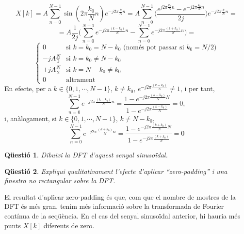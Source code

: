 \documentclass[11pt,a4]{article}
\numberwithin{equation}{section}
\theoremstyle{thmstyle}
\theoremstyle{thmstyle}
\theoremstyle{thmstyle}
\theoremstyle{thmstyle}
\theoremstyle{thmstyle}
\theoremstyle{thmstyle}
\newtheorem{question}{Qüestió}
\theoremstyle{thmstyle}
\renewcommand{\ss}{\scriptstyle}
\begin{document}
$$X[k] = A\sum_{n=0}^{N-1}\sin(2\pi\frac{k_0}{N}n)e^{-j2\pi\frac{k}{N}n} = A\sum_{n=0}^{N-1}\Big(\frac{e^{j2\pi\frac{k_0}{N}n}-e^{-j2\pi\frac{k_0}{N}n}}{2j}\Big)e^{-j2\pi\frac{k}{N}n}=
$$
$$
=A\frac{1}{2j}\Big(\sum_{n=0}^{N-1}e^{-j2\pi\frac{(k-k_0)}{N}n}-\sum_{n=0}^{N-1}e^{-j2\pi\frac{(k+k_0)}{N}n}\Big)=
$$
$$
\begin{cases}
0                 & \text{si $k=k_0=N-k_0$ (només pot passar si $k_0 = N/2$)} \\
-jA\frac{N}{2}     & \text{si $k=k_0\neq N-k_0$} \\
+jA\frac{N}{2}     & \text{si $k=N-k_0\neq k_0$} \\
0                 & \text{altrament}
\end{cases}
$$
En efecte, per a $k\in\lbrace 0,1,\cdots,N-1\rbrace$, $k\neq k_0$, $e^{-j2\pi\frac{(k-k_0)}{N}}\neq 1$, i per tant,
$$
\sum_{n=0}^{N-1}e^{-j2\pi\frac{(k-k_0)}{N}n}=\frac{1-e^{-j2\pi\frac{(k-k_0)}{N}N}}{1-e^{-j2\pi\frac{(k-k_0)}{N}}} = 0,
$$
i, anàlogament, si $k\in\lbrace 0,1,\cdots,N-1\rbrace$, $k\neq N-k_0$,
$$
\sum_{n=0}^{N-1}e^{-j2\pi\frac{(k+k_0)}{N}n}=\frac{1-e^{-j2\pi\frac{(k+k_0)}{N}N}}{1-e^{-j2\pi\frac{(k+k_0)}{N}}} = 0
$$

\begin{question}
Dibuixi la DFT d'aquest senyal sinusoïdal.
\end{question}

\begin{figure}[ht]
\centering
\end{figure}

\begin{question}
Expliqui qualitativament l’efecte d’aplicar “zero-padding” i una finestra no rectangular sobre la DFT.
\end{question}
El resultat d'aplicar zero-padding és que, com que el nombre de mostres de la DFT és més gran, tenim més informació sobre la transformada de Fourier contínua de la seqüència. En el cas del senyal sinusoïdal anterior, hi hauria més punts $X[k]$ diferents de zero.
\end{document}
